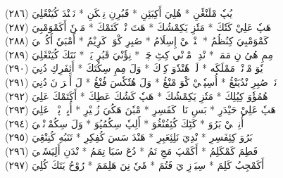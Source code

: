 \documentclass[a4paper, 10pt]{report}
\begin{document}
\begin{center}
\textarabic{(٢٨٦) \textcolor{mygreen}{يٖيٖ يُپٗ مْلَنْڠٗنِ  * هُلِيَ أَكِبَئِنِ  * قَبُرِنِ نِپٖكَنِ  * نَپٖنْدَ كُيَنْڠَلِيَ }} 
\\[5mm] 

\textarabic{(٢٨٧) \textcolor{mygreen}{هَپٗ عَلِيْ كَتٗكَ  * مَتٗزِ يَكِمْشُكَ  * هَتَ نْدٖ كَتَمْكَ  * مَنٖنٗ أَكَمْوَمْبِيَ }} 
\\[5mm] 

\textarabic{(٢٨٨) \textcolor{mygreen}{كَمْوَمْبِيَ كِنُظُمُ  * سٖنْدٖلٖيْ إِسِلَامُ  * صُبِرِ كْوَكٖ كَرِيْمُ  * أَمْبَيٗ أَكُلٖٹٖيَ }} 
\\[5mm] 

\textarabic{(٢٨٩) \textcolor{mygreen}{مِمِ هُىُ نِ مَمَكٖ  * نْدِيٖ مْوٖنْي كِٹِ چَكٖ  * نِؤٗنْيَ قَبُرِ يَكٖ  * نَتَكَ كُيَنْڠَلِيَ }} 
\\[5mm] 

\textarabic{(٢٩٠) \textcolor{mygreen}{يٗوَ مْوٖنْيٖ مَمْلَكَه  * لَكٖ هٗنْدٗوَ كِوٖكَ  * وَلَ مِمِ سِكُتَكَ  * أَئِفَرِكِ دُنِيَ }} 
\\[5mm] 

\textarabic{(٢٩١) \textcolor{mygreen}{نَوٖ صُبِرِ نْدُيَنْڠُ  * أُسِپٗتٖيْ كْوَ مْنْڠُ  * وَلَ هُتٗكٗسَ فُنْڠُ  * لَ أَخٖرَ نَ دُنِيَ }} 
\\[5mm] 

\textarabic{(٢٩٢) \textcolor{mygreen}{هُمُؤٗوَ كِپُلِكَ  * مَتٗزِ يَكِمْشُكَ  * هَپٗ كَشُكَ عَطِكَ  * أَكَتَمْكَ عَلِيَ }} 
\\[5mm] 

\textarabic{(٢٩٣) \textcolor{mygreen}{هَپٗ عَلِيْ حَيْدَرِ  * بَسِ نَاءٖ كَفَسِرِ  * مْبٗنَ هَكُيَ زُبٖيْرِ  * أُيِيٖ پْوٖكٖ عَلِيَ }} 
\\[5mm] 

\textarabic{(٢٩٤) \textcolor{mygreen}{أُنِئٖٹٖيْ بَرُوَ  * كَٹِكَ كُئِفُنْڠُوَ  * أَلِپٗ سِكُمُيُوَ  * وَلَ سِكُمْزٖنْڠٖيَ }} 
\\[5mm] 

\textarabic{(٢٩٥) \textcolor{mygreen}{بَرُوَ كِئِفَسِرِ  * نْدِيَ نَلِئِعَبِرِ  * هَنْدَ سَسَ كُفِكِرِ  * تَنَبُهِ كُنِنْڠِيَ }} 
\\[5mm] 

\textarabic{(٢٩٦) \textcolor{mygreen}{فَطِمَ كَمْكَلِمُ  * أَكَمْپَ مَجِ تَمُ  * دُعَ سَبَا تِمَمُ  * نْدَنِ أَلِيَسٗمٖيَ }} 
\\[5mm] 

\textarabic{(٢٩٧) \textcolor{mygreen}{أَكَمْجِبُ كَلِمَ  * سِيَوٖزِ يَ فَتُمَ  * مٗيٗ نِنَ هَلِمَمَ  * رُوْحُ يَتَكَ كُلِيَ }} 
\\[5mm] 


\end{center}
\end{document}
